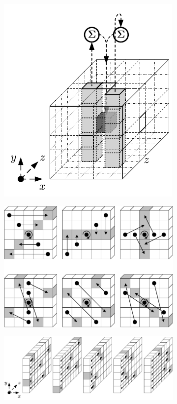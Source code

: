\documentclass{article}
\begin{document}
\begin{itemize}
\begin{figure}[H]
    \begin{subfigure}{.5\textwidth}
        \centering
        \includegraphics[scale=0.8]{theta_step}
    \end{subfigure}%
    \begin{subfigure}{.5\textwidth}
        \centering
        \includegraphics[scale=0.35]{pi_step}
    \end{subfigure}
    \begin{subfigure}{.5\textwidth}
        \centering
        \includegraphics[scale=0.7]{rho_step}

\end{subfigure}
\end{figure}
\end{itemize}
\end{document}
